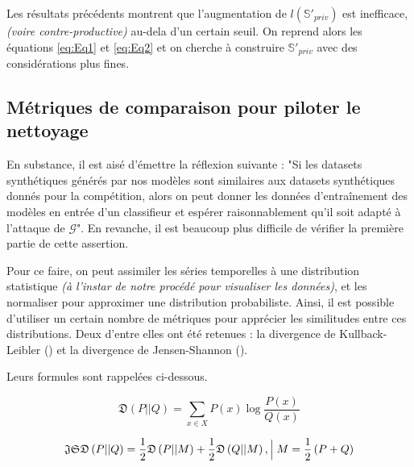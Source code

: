         Les résultats précédents montrent que l'augmentation de $l\left( \mathbb S'_{priv} \right)$ est inefficace, \textit{(voire contre-productive)}
        au-dela d'un certain seuil. On reprend alors les équations \ref{eq:Eq1} et \ref{eq:Eq2}
        et on cherche à construire $\mathbb S'_{priv}$ avec des considérations plus fines.

        \subsection{Métriques de comparaison pour piloter le nettoyage}

            En substance, il est aisé d'émettre la réflexion suivante : "Si les datasets
            synthétiques générés par nos modèles sont similaires aux datasets synthétiques
            donnés pour la compétition, alors on peut donner les données d'entraînement des
            modèles en entrée d'un classifieur et espérer raisonnablement qu'il soit adapté à
            l'attaque de $\mathcal G$". En revanche, il est beaucoup plus difficile de vérifier
            la première partie de cette assertion.

            Pour ce faire, on peut assimiler les séries temporelles à une distribution
            statistique \textit{(à l'instar de notre procédé pour visualiser les données)}, et
            les normaliser pour approximer une distribution probabiliste. Ainsi, il est possible
            d'utiliser un certain nombre de métriques pour apprécier les similitudes entre ces
            distributions. Deux d'entre elles ont été retenues : la divergence de
            Kullback-Leibler (\cite{wikiKLD}) et la divergence de Jensen-Shannon (\cite{wikiJSD}).

            Leurs formules sont rappelées ci-dessous.

            \begin{equation}\label{eq:Eq3}
                \mathfrak D \left( P || Q \right) = \sum_{x\in X} P(x)\log \frac{P(x)}{Q(x)}
            \end{equation}

            \begin{equation}\label{eq:Eq4}
                \mathfrak{JSD}\left( P||Q \right) = \frac12 \mathfrak D\left( P||M \right) +\frac
            12 \mathfrak D \left( Q || M \right),\Bigm \lvert M=\frac12 \left( P+Q \right)
            \end{equation}



